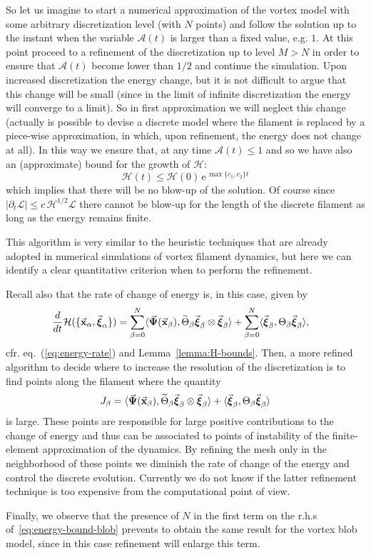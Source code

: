 \documentclass[a4paper,11pt]{article}
\numberwithin{equation}{section}
\newcommand{\la}{\langle}
\newcommand{\ra}{\rangle}
\newcommand{\vPsi}{\mbox{$\vec{\boldsymbol \Psi}$}}
\newcommand{\x}{\mbox{$\vec{\bf x}$}}
\newcommand{\bxi}{\mbox{$\vec{\boldsymbol \xi}$}}
\begin{document}
So let us imagine to start a numerical approximation of the vortex model with some arbitrary discretization level (with
$N$ points) and  follow the solution up to the instant when the variable
$\mathcal{A}(t)$ is larger than a fixed value, e.g. $1$. At this point
 proceed to a refinement of the discretization up to level $M>N$ in
order to ensure that $\mathcal{A}(t)$ become lower than $1/2$ and 
continue the simulation. Upon increased discretization the energy change, but it is not difficult to argue that this change will be small (since in the limit of infinite discretization the energy will converge to a limit). So in first approximation we will neglect this change (actually is possible to devise a discrete model where the filament is replaced by a piece-wise approximation, in which, upon refinement, the energy does not change at all). In this way we ensure that, at any
time $\mathcal{A}(t) \le 1$ and so we have also an (approximate) bound for the
growth of $\mathcal{H}$:
$$
\mathcal{H}(t) \le \mathcal{H}(0) \,\text{e}^{\,\max\{c_1,c_2\} t} 
$$ 
which implies that there will be no blow-up of the solution. Of course
since $|\partial_t \mathcal{L}| \le c\, \mathcal{H}^{1/2} \mathcal{L}$
there cannot be blow-up for the length of the discrete filament as
long as the energy remains finite.\par
%
This algorithm is very similar to the heuristic techniques that are
already adopted in numerical simulations of vortex filament dynamics,
but here we can identify a clear quantitative criterion when to perform the
refinement.\par
%
Recall also that the rate of change of energy is, in this case, given by
\begin{equation*}
    \begin{split}
 \frac{d}{dt}\mathcal{H}(\{\x_\alpha , \bxi_\alpha\}) & =
 \sum_{\beta=0}^N \la \vPsi(\x_\beta),  \widetilde \Theta_\beta
 \bxi_\beta\otimes\bxi_\beta \ra+ \sum_{\beta=0}^N \la \bxi_\beta,
 \Theta_\beta \bxi_\beta\ra, 
  \end{split}
\end{equation*}
cfr. eq.~(\ref{eq:energy-rate}) and Lemma~\ref{lemma:H-bounds}.  Then,
a more refined algorithm to decide where to increase the resolution of
the discretization is to find points along the filament where the 
quantity
$$
J_\beta = 
\la {\vPsi}(\x_\beta),  \widetilde \Theta_\beta
\bxi_\beta\otimes\bxi_\beta \ra
+  \la \bxi_\beta, \Theta_\beta \bxi_\beta\ra
$$ 
is large. These points are responsible for large positive
contributions to the change of energy and thus can be associated to
points of instability of the finite-element approximation of the
dynamics.  By refining the mesh only in the neighborhood of these
points we diminish the rate of change of the energy and control the
discrete evolution. Currently we do not know if the latter refinement
technique is too expensive from the computational point of view. \par
%
Finally, we observe that the presence of $N$ in the first term on the
r.h.s of~\eqref{eq:energy-bound-blob} prevents to obtain the same
result for the vortex blob model, since in this case refinement will
enlarge this term.
\end{document}
